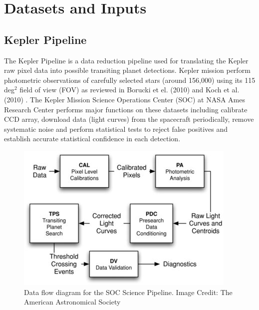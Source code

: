 \chapter{Datasets and Inputs}

\section{Kepler Pipeline}

The Kepler Pipeline \cite{2010ApJ...713L..87J} is a data reduction pipeline used for translating the Kepler raw pixel data into possible transiting planet detections. Kepler mission perform photometric observations of carefully selected stars (around 156,000) using its 115 deg$^2$ field of view (FOV) as reviewed in Borucki et el. (2010) \cite{Borucki977}
 and Koch et al. (2010)  \cite{2010ApJ...713L..79K}. The Kepler Mission Science Operations Center (SOC) at NASA Ames Research Center performs major functions on these datasets including calibrate CCD array, download data (light curves) from the spacecraft periodically, remove systematic noise \cite{2012PASP..124.1000S} and perform statistical tests to reject false positives and establish accurate statistical confidence in each detection.

\begin{figure}[!h]
\begin{center}
        \includegraphics[width=0.5\textheight]{img/kpipeline.jpg}
        \caption{Data flow diagram for the SOC Science Pipeline. Image Credit: The American Astronomical Society}  \label{fig:kpipleline}
\end{center}
\end{figure}

